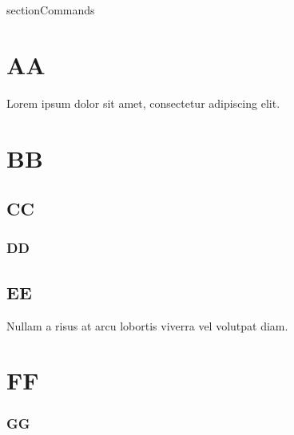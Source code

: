 
\begin{saveblock}{sectionCommands}
    \begin{highlightblock}[linewidth=0.5\textwidth,gobble=8]
        \section{AA}
        Lorem ipsum dolor sit amet,
        consectetur adipiscing elit.
        
        \section{BB}
        \subsection{CC}
        \subsubsection{DD}
        \subsection{EE}
        Nullam a risus at arcu
        lobortis viverra vel
        volutpat diam.
        
        \section{FF}
        \subsubsection{GG}
        ~~
    \end{highlightblock}
\end{saveblock}

